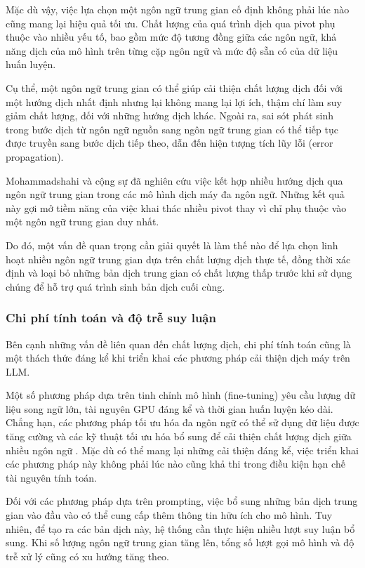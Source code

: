 Mặc dù vậy, việc lựa chọn một ngôn ngữ trung gian cố định không phải lúc nào cũng mang lại hiệu quả tối ưu. Chất lượng của quá trình dịch qua pivot phụ thuộc vào nhiều yếu tố, bao gồm mức độ tương đồng giữa các ngôn ngữ, khả năng dịch của mô hình trên từng cặp ngôn ngữ và mức độ sẵn có của dữ liệu huấn luyện.

Cụ thể, một ngôn ngữ trung gian có thể giúp cải thiện chất lượng dịch đối với một hướng dịch nhất định nhưng lại không mang lại lợi ích, thậm chí làm suy giảm chất lượng, đối với những hướng dịch khác. Ngoài ra, sai sót phát sinh trong bước dịch từ ngôn ngữ nguồn sang ngôn ngữ trung gian có thể tiếp tục được truyền sang bước dịch tiếp theo, dẫn đến hiện tượng tích lũy lỗi (error propagation).

Mohammadshahi và cộng sự \cite{mohammadshahi-etal-2024-investigating} đã nghiên cứu việc kết hợp nhiều hướng dịch qua ngôn ngữ trung gian trong các mô hình dịch máy đa ngôn ngữ. Những kết quả này gợi mở tiềm năng của việc khai thác nhiều pivot thay vì chỉ phụ thuộc vào một ngôn ngữ trung gian duy nhất.

Do đó, một vấn đề quan trọng cần giải quyết là làm thế nào để lựa chọn linh hoạt nhiều ngôn ngữ trung gian dựa trên chất lượng dịch thực tế, đồng thời xác định và loại bỏ những bản dịch trung gian có chất lượng thấp trước khi sử dụng chúng để hỗ trợ quá trình sinh bản dịch cuối cùng.

\subsubsection{Chi phí tính toán và độ trễ suy luận}

Bên cạnh những vấn đề liên quan đến chất lượng dịch, chi phí tính toán cũng là một thách thức đáng kể khi triển khai các phương pháp cải thiện dịch máy trên LLM.

Một số phương pháp dựa trên tinh chỉnh mô hình (fine-tuning) yêu cầu lượng dữ liệu song ngữ lớn, tài nguyên GPU đáng kể và thời gian huấn luyện kéo dài. Chẳng hạn, các phương pháp tối ưu hóa đa ngôn ngữ có thể sử dụng dữ liệu được tăng cường và các kỹ thuật tối ưu hóa bổ sung để cải thiện chất lượng dịch giữa nhiều ngôn ngữ \cite{yang-etal-2025-enanchored,li-etal-2024-eliciting}. Mặc dù có thể mang lại những cải thiện đáng kể, việc triển khai các phương pháp này không phải lúc nào cũng khả thi trong điều kiện hạn chế tài nguyên tính toán.

Đối với các phương pháp dựa trên prompting, việc bổ sung những bản dịch trung gian vào đầu vào có thể cung cấp thêm thông tin hữu ích cho mô hình. Tuy nhiên, để tạo ra các bản dịch này, hệ thống cần thực hiện nhiều lượt suy luận bổ sung. Khi số lượng ngôn ngữ trung gian tăng lên, tổng số lượt gọi mô hình và độ trễ xử lý cũng có xu hướng tăng theo.

